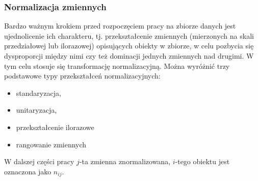 \documentclass[12pt,a4paper]{report}
\begin{document}
\subsubsection{Normalizacja zmiennych}
Bardzo ważnym krokiem przed rozpoczęciem pracy na zbiorze danych jest ujednolicenie ich charakteru, tj. przekształcenie zmiennych (mierzonych na skali przedziałowej lub ilorazowej) opisujących obiekty w zbiorze, w celu pozbycia się dysproporcji między nimi czy też dominacji jednych zmiennych nad drugimi. W tym celu stosuje się transformację normalizacyjną. Można wyróżnić trzy podstawowe typy przekształceń normalizacyjnych:
\begin{itemize}
\item standaryzacja,
\item unitaryzacja,
\item przekształcenie ilorazowe
\item rangowanie zmiennych
\end{itemize}
W dalszej części pracy $j$-ta zmienna znormalizowana, $i$-tego obiektu jest oznaczona jako $n_{ij}$.
\end{document}
